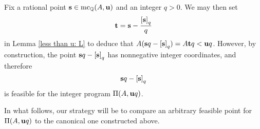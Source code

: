 \documentclass[11pt]{amsart}
\renewcommand{\!}[1]{{\color{red}\text{$\star$\,}#1\,$\star$}}
\begin{document}
%
%
%




\begin{remark}
\label{canonical-feasible: R}
Fix a rational point $\mathbf{s} \in \operatorname{mc}_{\mathbb{Q}}(A, \mathbf{u})$ and an integer $q>0$.  We may then set \[ \mathbf{t} = \mathbf{s} - \frac{\left[ \mathbf{s} \right]_q}{q} \] in Lemma \ref{less  than u: L} to deduce that $A (\mathbf{s} q - \left[ \mathbf{s} \right]_q ) =  A\mathbf{t}q <  \mathbf{u}q$.  However, by construction, the point $\mathbf{s}q - \left[ \mathbf{s} \right]_q$ has nonnegative integer coordinates, and therefore \[ \mathbf{s}q - \left[ \mathbf{s} \right]_q\] is feasible for the integer program $\Pi(A, \mathbf{u}q)$. 
\end{remark}

 In what follows, our strategy will be to compare an arbitrary feasible point for $\Pi(A, \mathbf{u}q)$ to the canonical one constructed above.   


\end{document}

